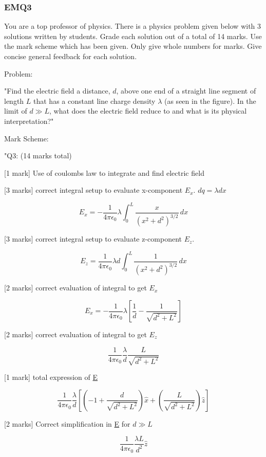 \subsubsection{EMQ3}

You are a top professor of physics. There is a physics problem given below with 3 solutions written by students. Grade each solution out of a total of 14 marks. Use the mark scheme which has been given. Only give whole numbers for marks. Give concise general feedback for each solution. 

Problem:

"Find the electric field a distance, \( d \), above one end of a straight line segment of length \( L \) that has a constant line charge density \( \lambda \) (as seen in the figure). In the limit of \( d \gg L \), what does the electric field reduce to and what is its physical interpretation?"

Mark Scheme:

"{Q3: (14 marks total)}

[1 mark] Use of coulombs law to integrate and find electric field

[3 marks] correct integral setup to evaluate x-component \( E_x \). \( dq = \lambda dx \)

\[ E_x = - \frac{1}{4\pi \epsilon_0} \lambda \int_{0}^{L} \frac{x}{(x^2+d^2)^{3/2}} \, dx \]

[3 marks] correct integral setup to evaluate z-component \( E_z \).

\[ E_z = \frac{1}{4\pi \epsilon_0} \lambda d  \int_{0}^{L} \frac{1}{(x^2+d^2)^{3/2}} \, dx \]

[2 marks] correct evaluation of integral to get \( E_x \)

\[ E_x = -\frac{1}{4 \pi \epsilon_0} \lambda \left [ \frac{1}{d} - \frac{1}{\sqrt{d^2+L^2}} \right ] \]

[2 marks] correct evaluation of integral to get \( E_z \)

\[ \frac{1}{4 \pi \epsilon_0} \frac{\lambda}{d} \frac{L}{\sqrt{d^2+L^2}} \]

[1 mark] total expression of \underline{E}

\[
\frac{1}{4 \pi \epsilon_0} \frac{\lambda}{d} \left [ \left ( -1+\frac{d}{\sqrt{d^2+L^2}} \right ) \hat{x} +\left ( \frac{L}{\sqrt{d^2+L^2}} \right ) \hat{z} \right ]
\]

[2 marks] Correct simplification in \underline{E} for \( d \gg L \)

\[ \frac{1}{4 \pi \epsilon_0} \frac{\lambda L}{d^2} \hat{z} \]

